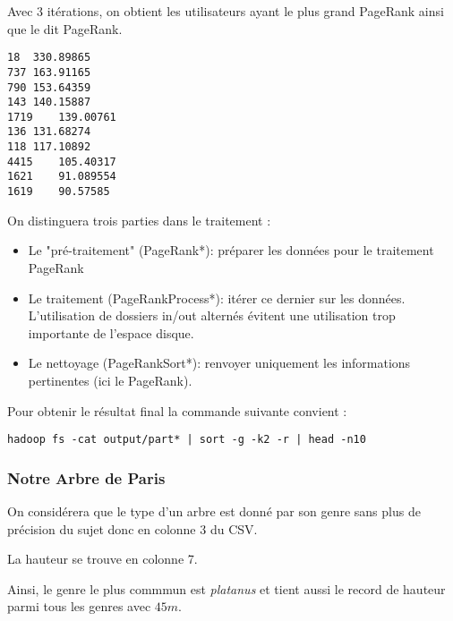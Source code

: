 \documentclass[french]{article}
\begin{document}
Avec 3 itérations, on obtient les utilisateurs ayant le plus grand PageRank ainsi que le dit PageRank.

\begin{verbatim}
18	330.89865
737	163.91165
790	153.64359
143	140.15887
1719	139.00761
136	131.68274
118	117.10892
4415	105.40317
1621	91.089554
1619	90.57585
\end{verbatim}

On distinguera trois parties dans le traitement :

\begin{itemize}
	\item Le "pré-traitement" (PageRank*): préparer les données pour le traitement PageRank
	\item Le traitement (PageRankProcess*): itérer ce dernier sur les données. L'utilisation de dossiers in/out alternés évitent une utilisation trop importante de l'espace disque.
	\item Le nettoyage (PageRankSort*): renvoyer uniquement les informations pertinentes (ici le PageRank).
\end{itemize}

Pour obtenir le résultat final la commande suivante convient : 

\begin{verbatim}
hadoop fs -cat output/part* | sort -g -k2 -r | head -n10
\end{verbatim}

\subsubsection{Notre Arbre de Paris}
On considérera que le type d'un arbre est donné par son genre sans plus de précision du sujet donc en colonne 3 du CSV.

La hauteur se trouve en colonne 7.

Ainsi, le genre le plus commmun est \textsl{platanus} et tient aussi le record de hauteur parmi tous les genres avec $45m$.
\end{document}
